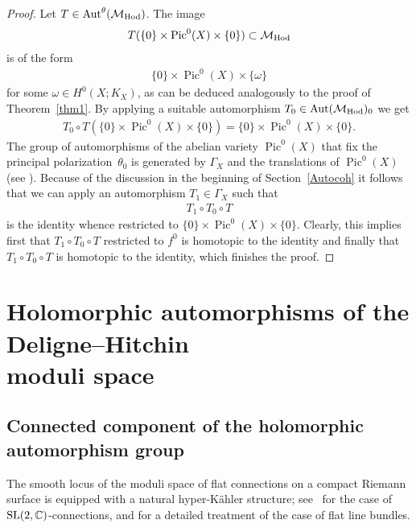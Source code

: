 \documentclass[pdftex]{sigma}
\numberwithin{equation}{section}
\begin{document}
\begin{proof}
Let $T\in\operatorname{Aut}^\theta({\mathcal M}_{\rm Hod})$. The image
\begin{gather*}T(\{0\}\times \operatorname{Pic}^0(X)\times\{0\})\subset\mathcal M_{\rm Hod}\end{gather*}
is of the form
\begin{gather*}\{0\}\times \operatorname{Pic}^0(X)\times\{\omega\}\end{gather*}
for some $\omega\in H^0(X;K_X)$, as can be deduced analogously to the proof of Theorem~\ref{thm1}. By applying a suitable automorphism $T_0\in\operatorname{Aut}({\mathcal M}_{\rm Hod})_0$ we get
\begin{gather*}T_0\circ T(\{0\}\times \operatorname{Pic}^0(X)\times\{0\})=\{0\}\times \operatorname{Pic}^0(X)\times\{0\}.\end{gather*}
The group of automorphisms of the abelian variety $\operatorname{Pic}^0(X)$ that f\/ix the principal polarization~$\theta_0$ is generated by $\Gamma_X$ and the translations of $\operatorname{Pic}^0(X)$ (see \cite[p.~35, Hauptsatz]{We}). Because of the discussion in the beginning of Section~\ref{Autocoh} it follows that we can apply an automorphism $T_1\in\Gamma_X$ such that
\begin{gather*}T_1\circ T_0\circ T\end{gather*} is the identity whence restricted to $\{0\}\times \operatorname{Pic}^0(X)\times\{0\}$.
Clearly, this implies f\/irst that $T_1\circ T_0\circ T$ restricted to $f^0$ is homotopic to the identity and f\/inally that $T_1\circ T_0\circ T$ is homotopic to the identity, which f\/inishes the proof.
\end{proof}

\section[Holomorphic automorphisms of the Deligne--Hitchin moduli space]{Holomorphic automorphisms of the Deligne--Hitchin\\ moduli space}

\subsection{Connected component of the holomorphic automorphism group}\label{aut0mdh}

The smooth locus of the moduli space of f\/lat connections on a compact Riemann surface is equipped with a natural hyper-K\"ahler structure; see~\cite{H} for the case of ${\rm SL}(2,\mathbb C)$-connections, and \cite{GX} for a detailed treatment of the case of f\/lat line bundles.
\end{document}
